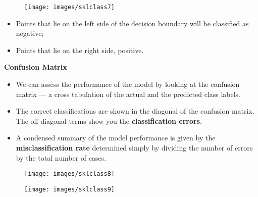 \documentclass[SKL-MASTER.tex]{subfiles}
\begin{document}
\newpage
\begin{figure}[h!]
\centering
\texttt{[image: images/sklclass7]}

\end{figure}

	\begin{itemize}
	\item Points that lie on the left side of the decision boundary will be classified as negative; 
	\item Points that lie on the right side, positive. 
	\end{itemize}

\newpage
\LARGE
\textbf{Confusion Matrix}
\begin{itemize}
\item We can assess the performance of the model by looking at the confusion matrix — a cross tabulation of the actual and the predicted class labels. 

\item The correct classifications are shown in the diagonal of the confusion matrix. The off-diagonal terms show you the \textbf{classification errors}. 
\item A condensed summary of the model performance is given by the \textbf{misclassification rate} determined simply by dividing the number of errors by the total number of cases.
\end{itemize}

\newpage

\begin{figure}[h!]
\centering
\texttt{[image: images/sklclass8]}

\end{figure}

\begin{figure}[h!]
\centering
\texttt{[image: images/sklclass9]}

\end{figure}
\end{document}
